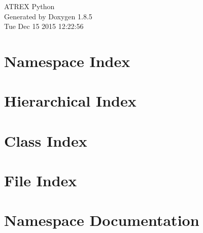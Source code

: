 \documentclass[twoside]{book}
\newcommand{\clearemptydoublepage}{%
  \newpage{\pagestyle{empty}\cleardoublepage}%
}
\begin{document}
\hypersetup{pageanchor=false}
\begin{titlepage}
\vspace*{7cm}
\begin{center}%
{\Large A\-T\-R\-E\-X Python }\\
\vspace*{1cm}
{\large Generated by Doxygen 1.8.5}\\
\vspace*{0.5cm}
{\small Tue Dec 15 2015 12:22:56}\\
\end{center}
\end{titlepage}
\clearemptydoublepage
\tableofcontents
\clearemptydoublepage
{}
\hypersetup{pageanchor=true}

\chapter{Namespace Index}

\chapter{Hierarchical Index}

\chapter{Class Index}

\chapter{File Index}

\chapter{Namespace Documentation}































\end{document}

